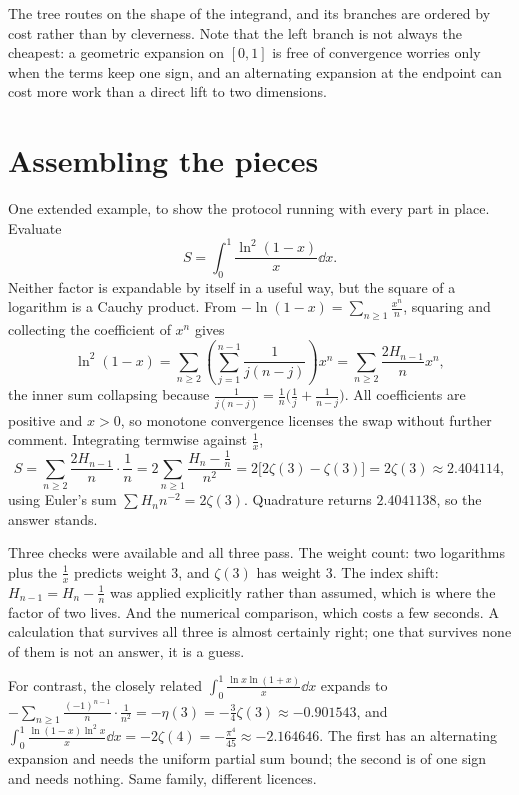 The tree routes on the shape of the integrand, and its branches are ordered by cost rather than by cleverness. Note that the left branch is not always the cheapest: a geometric expansion on $[0,1]$ is free of convergence worries only when the terms keep one sign, and an alternating expansion at the endpoint can cost more work than a direct lift to two dimensions.

\section{Assembling the pieces}

One extended example, to show the protocol running with every part in place. Evaluate
\[S=\int_0^1\frac{\ln^{2}(1-x)}{x}\dd x.\]
Neither factor is expandable by itself in a useful way, but the square of a logarithm is a Cauchy product. From $-\ln(1-x)=\sum_{n\geq1}\frac{x^{n}}{n}$, squaring and collecting the coefficient of $x^{n}$ gives
\[\ln^{2}(1-x)=\sum_{n\geq2}\left(\sum_{j=1}^{n-1}\frac{1}{j(n-j)}\right)x^{n}=\sum_{n\geq2}\frac{2H_{n-1}}{n}x^{n},\]
the inner sum collapsing because $\frac{1}{j(n-j)}=\frac1n\bigl(\frac1j+\frac{1}{n-j}\bigr)$. All coefficients are positive and $x>0$, so monotone convergence licenses the swap without further comment. Integrating termwise against $\frac1x$,
\[S=\sum_{n\geq2}\frac{2H_{n-1}}{n}\cdot\frac1n=2\sum_{n\geq1}\frac{H_n-\tfrac1n}{n^{2}}=2\bigl[2\zeta(3)-\zeta(3)\bigr]=2\zeta(3)\approx2.404114,\]
using Euler's sum $\sum H_nn^{-2}=2\zeta(3)$. Quadrature returns $2.4041138$, so the answer stands.

Three checks were available and all three pass. The weight count: two logarithms plus the $\tfrac1x$ predicts weight $3$, and $\zeta(3)$ has weight $3$. The index shift: $H_{n-1}=H_n-\tfrac1n$ was applied explicitly rather than assumed, which is where the factor of two lives. And the numerical comparison, which costs a few seconds. A calculation that survives all three is almost certainly right; one that survives none of them is not an answer, it is a guess.

For contrast, the closely related $\int_0^1\frac{\ln x\ln(1+x)}{x}\dd x$ expands to $-\sum_{n\geq1}\frac{(-1)^{n-1}}{n}\cdot\frac{1}{n^{2}}=-\eta(3)=-\tfrac34\zeta(3)\approx-0.901543$, and $\int_0^1\frac{\ln(1-x)\ln^{2}x}{x}\dd x=-2\zeta(4)=-\tfrac{\pi^{4}}{45}\approx-2.164646$. The first has an alternating expansion and needs the uniform partial sum bound; the second is of one sign and needs nothing. Same family, different licences.

